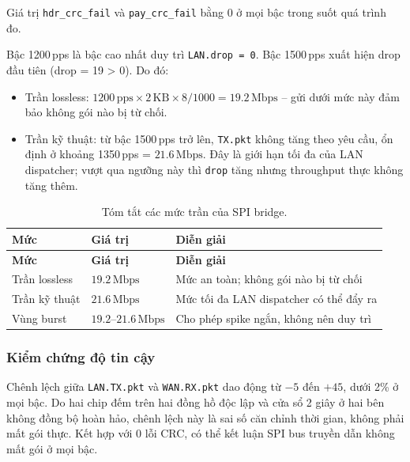 Giá trị \texttt{hdr\_crc\_fail} và \texttt{pay\_crc\_fail} bằng 0 ở mọi bậc trong suốt quá trình đo.

Bậc 1200\,pps là bậc cao nhất duy trì \texttt{LAN.drop = 0}. Bậc 1500\,pps xuất hiện drop đầu tiên (drop = 19 > 0). Do đó:

\begin{itemize}
    \item Trần lossless: $1200\,\text{pps} \times 2\,\text{KB} \times 8 / 1000 = 19{.}2\,\text{Mbps}$ -- gửi dưới mức này đảm bảo không gói nào bị từ chối.
    \item Trần kỹ thuật: từ bậc 1500\,pps trở lên, \texttt{TX.pkt} không tăng theo yêu cầu, ổn định ở khoảng 1350\,pps = $21{.}6\,\text{Mbps}$. Đây là giới hạn tối đa của LAN dispatcher; vượt qua ngưỡng này thì \texttt{drop} tăng nhưng throughput thực không tăng thêm.
\end{itemize}

\begin{longtable}{|p{3cm}|p{3cm}|p{8cm}|}
    \caption{Tóm tắt các mức trần của SPI bridge.}
    \label{tab:spi_summary} \\
    \hline
    \textbf{Mức} & \textbf{Giá trị} & \textbf{Diễn giải} \\ \hline
    \endfirsthead
    \hline
    \textbf{Mức} & \textbf{Giá trị} & \textbf{Diễn giải} \\ \hline
    \endhead
    \hline
    \endfoot
    \endlastfoot
    Trần lossless & $19{.}2\,\text{Mbps}$ & Mức an toàn; không gói nào bị từ chối \\ \hline
    Trần kỹ thuật & $21{.}6\,\text{Mbps}$ & Mức tối đa LAN dispatcher có thể đẩy ra \\ \hline
    Vùng burst & $19{.}2$--$21{.}6\,\text{Mbps}$ & Cho phép spike ngắn, không nên duy trì \\ \hline
\end{longtable}

\subsubsection{Kiểm chứng độ tin cậy}

Chênh lệch giữa \texttt{LAN.TX.pkt} và \texttt{WAN.RX.pkt} dao động từ $-5$ đến $+45$, dưới 2\% ở mọi bậc. Do hai chip đếm trên hai đồng hồ độc lập và cửa sổ 2 giây ở hai bên không đồng bộ hoàn hảo, chênh lệch này là sai số căn chỉnh thời gian, không phải mất gói thực. Kết hợp với 0 lỗi CRC, có thể kết luận SPI bus truyền dẫn không mất gói ở mọi bậc.

